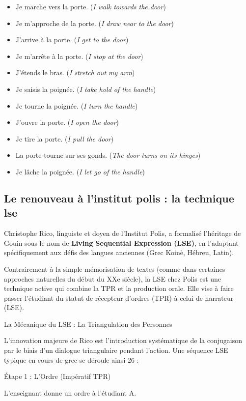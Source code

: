 \begin{itemize}\item Je marche vers la porte. (\textit{I walk towards the door})\item Je m'approche de la porte. (\textit{I draw near to the door})\item J'arrive à la porte. (\textit{I get to the door})\item Je m'arrête à la porte. (\textit{I stop at the door})\item J'étends le bras. (\textit{I stretch out my arm})\item Je saisis la poignée. (\textit{I take hold of the handle})\item Je tourne la poignée. (\textit{I turn the handle})\item J'ouvre la porte. (\textit{I open the door})\item Je tire la porte. (\textit{I pull the door})\item La porte tourne sur ses gonds. (\textit{The door turns on its hinges})\item Je lâche la poignée. (\textit{I let go of the handle})\end{itemize}

\subsection{Le renouveau à l'institut polis : la technique lse}

Christophe Rico, linguiste et doyen de l'Institut Polis, a formalisé l'héritage de Gouin sous le nom
de \textbf{Living Sequential Expression (LSE)}, en l'adaptant spécifiquement aux défis des langues
anciennes (Grec Koinè, Hébreu, Latin).\cite{III-2-2-ref19}

Contrairement à la simple mémorisation de textes (comme dans certaines approches \og naturelles\fg{}
du début du XXe siècle), la LSE chez Polis est une technique active qui combine la TPR et la
production orale. Elle vise à faire passer l'étudiant du statut de récepteur d'ordres (TPR) à celui
de narrateur (LSE).

La Mécanique du LSE : La Triangulation des Personnes

L'innovation majeure de Rico est l'introduction systématique de la conjugaison par le biais d'un
dialogue triangulaire pendant l'action. Une séquence LSE typique en cours de grec se déroule ainsi
26 :

Étape 1 : L'Ordre (Impératif \- TPR)

L'enseignant donne un ordre à l'étudiant A.


